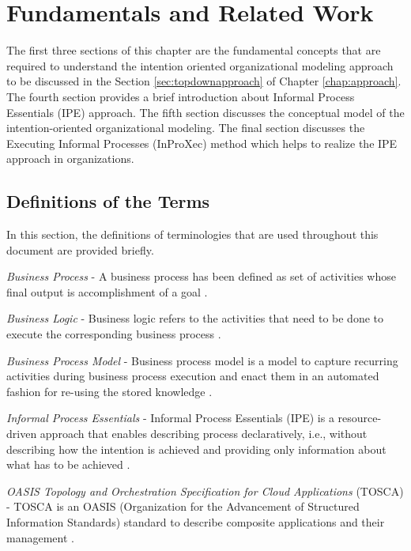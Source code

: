 \chapter{Fundamentals and Related Work}
\label{chap:fundamentals}
The first three sections of this chapter are the fundamental concepts that are required to understand the intention oriented organizational modeling approach to be discussed in the Section \ref{sec:topdownapproach} of Chapter \ref{chap:approach}. The fourth section provides a brief introduction about Informal Process Essentials (IPE) approach. The fifth section discusses the conceptual model of the intention-oriented organizational modeling. The final section discusses the Executing Informal Processes (InProXec) method which helps to realize the IPE approach in organizations.

\section{Definitions of the Terms}
\label{sec:termdefinitions}
In this section, the definitions of terminologies that are used throughout this document are provided briefly.

\textit{Business Process} -  A business process has been defined as set of activities whose final output is accomplishment of a goal \cite{Weske2012}.  

\textit{Business Logic} - Business logic refers to the activities that need to be done to execute the corresponding business process \cite{Weske2012}. 

\textit{Business Process Model} - Business process model is a model to capture recurring activities during business process execution and enact them in an automated fashion for re-using the stored knowledge \cite{Weske2012}. 

\textit{Informal Process Essentials} - Informal Process Essentials (IPE) is a resource-driven approach that enables describing process declaratively, i.e., without describing how the intention is achieved and providing only information about what has to be achieved \cite{Sungur2014a}. 

\textit{OASIS Topology and Orchestration Specification for Cloud Applications} (TOSCA) - TOSCA is an OASIS (Organization for the Advancement of Structured Information Standards) standard to describe composite applications and their management \cite{Kopp2013}.  

